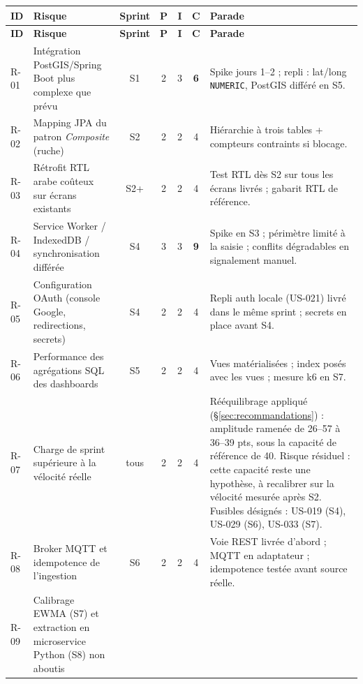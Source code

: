 {\small
\setlength{\tabcolsep}{4pt}%
\begin{longtable}{lp{4.9cm}ccccp{5.1cm}}
\toprule
\textbf{ID} & \textbf{Risque} & \textbf{Sprint} & \textbf{P} & \textbf{I} & \textbf{C} & \textbf{Parade} \\
\midrule
\endfirsthead
\toprule
\textbf{ID} & \textbf{Risque} & \textbf{Sprint} & \textbf{P} & \textbf{I} & \textbf{C} & \textbf{Parade} \\
\midrule
\endhead
\bottomrule
\endlastfoot
R-01 & Intégration PostGIS/Spring Boot plus complexe que prévu
     & S1 & 2 & 3 & \textbf{6}
     & Spike jours 1--2 ; repli : lat/long \texttt{NUMERIC}, PostGIS différé en S5. \\
\addlinespace
R-02 & Mapping JPA du patron \emph{Composite} (ruche)
     & S2 & 2 & 2 & 4
     & Hiérarchie à trois tables + compteurs contraints si blocage. \\
\addlinespace
R-03 & Rétrofit RTL arabe coûteux sur écrans existants
     & S2+ & 2 & 2 & 4
     & Test RTL dès S2 sur tous les écrans livrés ; gabarit RTL de référence. \\
\addlinespace
R-04 & Service Worker / IndexedDB / synchronisation différée
     & S4 & 3 & 3 & \textbf{9}
     & Spike en S3 ; périmètre limité à la saisie ; conflits dégradables en signalement manuel. \\
\addlinespace
R-05 & Configuration OAuth (console Google, redirections, secrets)
     & S4 & 2 & 2 & 4
     & Repli auth locale (US-021) livré dans le même sprint ; secrets en place avant S4. \\
\addlinespace
R-06 & Performance des agrégations SQL des dashboards
     & S5 & 2 & 2 & 4
     & Vues matérialisées ; index posés avec les vues ; mesure k6 en S7. \\
\addlinespace
R-07 & Charge de sprint supérieure à la vélocité réelle
     & tous & 2 & 2 & 4
     & Rééquilibrage appliqué (§\ref{sec:recommandations}) : amplitude ramenée de
       26--57 à 36--39 pts, sous la capacité de référence de 40. Risque
       résiduel : cette capacité reste une hypothèse, à recalibrer sur la
       vélocité mesurée après S2. Fusibles désignés : US-019 (S4),
       US-029 (S6), US-033 (S7). \\
\addlinespace
R-08 & Broker MQTT et idempotence de l'ingestion
     & S6 & 2 & 2 & 4
     & Voie REST livrée d'abord ; MQTT en adaptateur ; idempotence testée avant source réelle. \\
\addlinespace
R-09 & Calibrage EWMA (S7) et extraction en microservice Python (S8) non aboutis

\end{longtable}}
